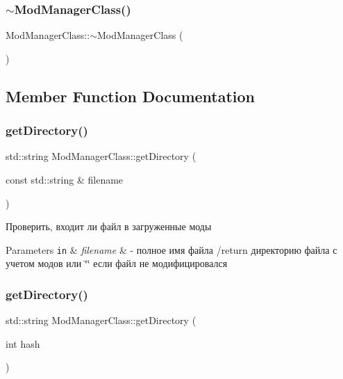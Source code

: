 \subsubsection{\texorpdfstring{$\sim$\+Mod\+Manager\+Class()}{~ModManagerClass()}}
{\footnotesize\ttfamily Mod\+Manager\+Class\+::$\sim$\+Mod\+Manager\+Class (\begin{DoxyParamCaption}{ }\end{DoxyParamCaption})\hspace{0.3cm}{\ttfamily [private]}}



\subsection{Member Function Documentation}
\mbox{\label{class_mod_manager_class_a3a1876a333b15822a5c25ec85a9cfab5}} 
\subsubsection{\texorpdfstring{get\+Directory()}{getDirectory()}\hspace{0.1cm}{\footnotesize\ttfamily [1/2]}}
{\footnotesize\ttfamily std\+::string Mod\+Manager\+Class\+::get\+Directory (\begin{DoxyParamCaption}\item[{const std\+::string \&}]{filename }\end{DoxyParamCaption})}



Проверить, входит ли файл в загруженные моды 


\begin{DoxyParams}[1]{Parameters}
\mbox{\tt in}  & {\em filename} & -\/ полное имя файла /return директорию файла с учетом модов или \char`\"{}\char`\"{} если файл не модифицировался \\
\hline
\end{DoxyParams}
\mbox{\label{class_mod_manager_class_a38478a4eb5ddd9746806649b24edbd5f}} 
\subsubsection{\texorpdfstring{get\+Directory()}{getDirectory()}\hspace{0.1cm}{\footnotesize\ttfamily [2/2]}}
{\footnotesize\ttfamily std\+::string Mod\+Manager\+Class\+::get\+Directory (\begin{DoxyParamCaption}\item[{int}]{hash }\end{DoxyParamCaption})}



